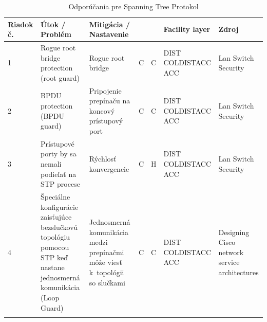 \newpage
\begin{longtable}[!htbp]{|C{2.5em}L{9em}L{9em}C{2em}C{2.5em}C{7.5em}L{10em}|}
	
	\hline
	\centering
	
	Riadok č.	&Útok / Problém	&Mitigácia / Nastavenie	& 	&	&Facility layer	&Zdroj\\
	\endhead
	
	 1	&Rogue root bridge protection (root guard)	&Rogue root bridge 	&C	&C	&DIST
	COLDISTACC
	ACC	&Lan Switch Security \cite{Vyncke2008}\\
	2	&BPDU protection (BPDU guard)	&Pripojenie prepínaču na koncový prístupový port	&C	&C	&DIST
	COLDISTACC
	ACC	&Lan Switch Security \cite{Vyncke2008}\\
	 3	&Prístupové porty by sa nemali podieľať na STP procese	&Rýchlosť konvergencie	&C	&H	&DIST
	COLDISTACC
	ACC	&Lan Switch Security \cite{Vyncke2008}\\
	4	&Špeciálne konfigurácie zaisťujúce bezslučkovú topológiu pomocou STP keď nastane jednosmerná komunikácia (Loop Guard)	&Jednosmerná komunikácia medzi prepínačmi môže viesť k~topológii so slučkami	&C	&C	&DIST
	COLDISTACC
	ACC	&Designing Cisco network service architectures \cite{Tiso2012}\\
	
	\hline
	\caption{Odporúčania pre Spanning Tree Protokol}
	\label{tab:stp}%
\end{longtable}%

